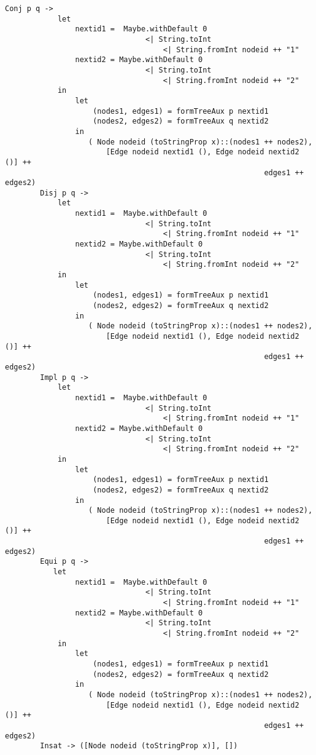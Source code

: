 \documentclass[a4paper]{report}
\begin{document}
\begin{lstlisting}[caption= Definición de la función formTree]
        Conj p q -> 
            let 
                nextid1 =  Maybe.withDefault 0 
                                <| String.toInt 
                                    <| String.fromInt nodeid ++ "1"
                nextid2 = Maybe.withDefault 0 
                                <| String.toInt 
                                    <| String.fromInt nodeid ++ "2"
            in
                let 
                    (nodes1, edges1) = formTreeAux p nextid1
                    (nodes2, edges2) = formTreeAux q nextid2
                in
                   ( Node nodeid (toStringProp x)::(nodes1 ++ nodes2),  
                       [Edge nodeid nextid1 (), Edge nodeid nextid2 ()] ++ 
                                                           edges1 ++ edges2)
        Disj p q -> 
            let 
                nextid1 =  Maybe.withDefault 0 
                                <| String.toInt 
                                    <| String.fromInt nodeid ++ "1"
                nextid2 = Maybe.withDefault 0 
                                <| String.toInt 
                                    <| String.fromInt nodeid ++ "2"
            in
                let 
                    (nodes1, edges1) = formTreeAux p nextid1
                    (nodes2, edges2) = formTreeAux q nextid2
                in
                   ( Node nodeid (toStringProp x)::(nodes1 ++ nodes2),  
                       [Edge nodeid nextid1 (), Edge nodeid nextid2 ()] ++ 
                                                           edges1 ++ edges2)
        Impl p q -> 
            let 
                nextid1 =  Maybe.withDefault 0 
                                <| String.toInt 
                                    <| String.fromInt nodeid ++ "1"
                nextid2 = Maybe.withDefault 0 
                                <| String.toInt 
                                    <| String.fromInt nodeid ++ "2"
            in
                let 
                    (nodes1, edges1) = formTreeAux p nextid1
                    (nodes2, edges2) = formTreeAux q nextid2
                in
                   ( Node nodeid (toStringProp x)::(nodes1 ++ nodes2),  
                       [Edge nodeid nextid1 (), Edge nodeid nextid2 ()] ++ 
                                                           edges1 ++ edges2)
        Equi p q -> 
           let 
                nextid1 =  Maybe.withDefault 0 
                                <| String.toInt 
                                    <| String.fromInt nodeid ++ "1"
                nextid2 = Maybe.withDefault 0 
                                <| String.toInt 
                                    <| String.fromInt nodeid ++ "2"
            in
                let 
                    (nodes1, edges1) = formTreeAux p nextid1
                    (nodes2, edges2) = formTreeAux q nextid2
                in
                   ( Node nodeid (toStringProp x)::(nodes1 ++ nodes2),  
                       [Edge nodeid nextid1 (), Edge nodeid nextid2 ()] ++ 
                                                           edges1 ++ edges2)
        Insat -> ([Node nodeid (toStringProp x)], [])
\end{lstlisting}
\end{document}
